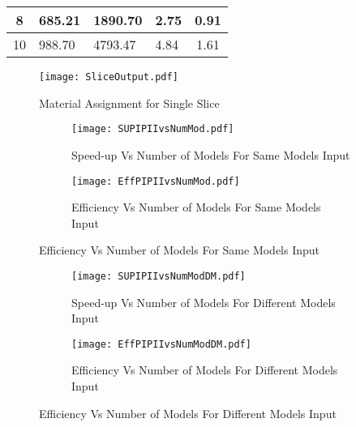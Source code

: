 \begin{table}
\begin{tabular}{|c|l|l|l|c|}
8                                                                                                                            & 685.21                                                                                                                                                                   & 1890.70                                                                                                                                   & 2.75                            & 0.91         \\ \hline
10                                                                                                                           & 988.70                                                                                                                                                                  & 4793.47                                                                                                                                    & 4.84                            & 1.61         \\ \hline
\end{tabular}
\end{table}

\begin{figure}[t]
\centering
\texttt{[image: SliceOutput.pdf]}
\caption{Material Assignment for Single Slice}
\label{fig:SliceOutput}
\end{figure}

\begin{figure}
\centering
\begin{subfigure}
\centering
\captionsetup[subfigure]{labelformat=empty}
\texttt{[image: SUPIPIIvsNumMod.pdf]}
\caption{Speed-up Vs Number of Models For Same Models Input}
\label{fig:SUPIPIIvsNumMod}
\end{subfigure}
\begin{subfigure}
\centering
\texttt{[image: EffPIPIIvsNumMod.pdf]}
\caption{Efficiency Vs Number of Models For Same Models Input}
\label{fig:EffPIPIIvsNumMod}
\end{subfigure}
\end{figure}


\begin{figure}
\centering
\captionsetup[subfigure]{labelformat=empty}
\begin{subfigure}
\centering
\texttt{[image: SUPIPIIvsNumModDM.pdf]}
\caption{Speed-up Vs Number of Models For Different Models Input}
\label{fig:SUPIPIIvsNumModDM}
\end{subfigure}
\begin{subfigure}
\centering
\texttt{[image: EffPIPIIvsNumModDM.pdf]}
\caption{Efficiency Vs Number of Models For Different Models Input}
\label{fig:EffPIPIIvsNumModDM}
\end{subfigure}
\end{figure}


